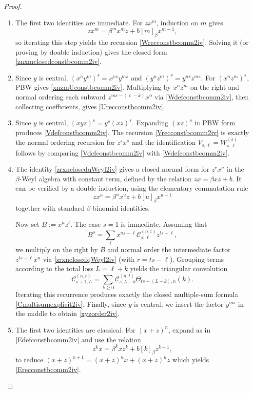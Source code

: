\documentclass{amsart}
\theoremstyle{definition}
\theoremstyle{remark}
\numberwithin{equation}{section}
\begin{document}
\begin{proof}
\begin{enumerate}
\item [\rm (1)] The first two identities are immediate. For $zx^m$, induction on $m$ gives
\[
zx^m=\beta^m x^m z+b[m]_\beta x^{m-1},
\]
so iterating this step yields the recursion \eqref{Wrecconstbcomm2iv}. Solving it (or proving by double induction) gives the closed form \eqref{znxmclosedconstbcomm2iv}.

\item [\rm (2)] Since $y$ is central, $(x^n y^m)^s=x^{ns}y^{ms}$ and $(y^n z^m)^s=y^{ns}z^{ms}$. For $(x^n z^m)^s$, PBW gives \eqref{xnzmUconstbcomm2iv}. Multiplying by $x^n z^m$ on the right and normal ordering each subword $z^{ms-(\ell-k)}x^n$ via \eqref{Wdefconstbcomm2iv}, then collecting coefficients, gives \eqref{Urecconstbcomm2iv}. 

\item [\rm (3)] Since $y$ is central, $(xyz)^s=y^s(xz)^s$. Expanding $(xz)^s$ in PBW form produces \eqref{Vdefconstbcomm2iv}. The recursion \eqref{Vrecconstbcomm2iv} is exactly the normal ordering recursion for $z^s x^s$ and the identification $V_{s,\ell}=W^{(s)}_{s,\ell}$
follows by comparing \eqref{Vdefconstbcomm2iv} with \eqref{Wdefconstbcomm2iv}.

\item [\rm (4)] The identity \eqref{zrxnclosedqWeyl2iv} gives a closed normal form for $z^{r}x^{n}$ in the $\beta$-Weyl algebra with constant term, defined by the relation $zx=\beta xz+b$. It can be verified by a double induction, using the elementary commutation rule
\[
zx^{u}=\beta^{u}x^{u}z+b[u]_{\beta}x^{u-1}
\]
together with standard $\beta$-binomial identities.

Now set $B:=x^{n}z^{t}$. The case $s=1$ is immediate. Assuming that
\[
B^{s}=\sum_{\ell} x^{ns-\ell}\mathcal C^{(n,t)}_{s,\ell}z^{ts-\ell},
\]
we multiply on the right by $B$ and normal order the intermediate factor $z^{ts-\ell}x^{n}$ via \eqref{zrxnclosedqWeyl2iv} (with $r=ts-\ell$). Grouping terms according to the total loss $L=\ell+k$ yields the triangular convolution
\[
\mathcal C^{(n,t)}_{s+1,L}=\sum_{k\ge 0}\mathcal C^{(n,t)}_{s,L-k}\Theta_{ts-(L-k),n}(k).
\]
Iterating this recurrence produces exactly the closed multiple-sum formula
\eqref{Cmultisumexplicit2iv}. Finally, since $y$ is central, we insert the factor $y^{ms}$ in the middle to obtain \eqref{xyzorder2iv}.

\item [\rm (5)] The first two identities are classical. For $(x+z)^n$, expand as in \eqref{Edefconstbcomm2iv} and use the relation 
\[
z^k x = \beta^k x z^k+b[k]_{\beta}z^{k-1},
\]
to reduce $(x+z)^{n+1}=(x+z)^n x+(x+z)^n z$ which yields \eqref{Erecconstbcomm2iv}.
\end{enumerate}
\end{proof}
\end{document}
